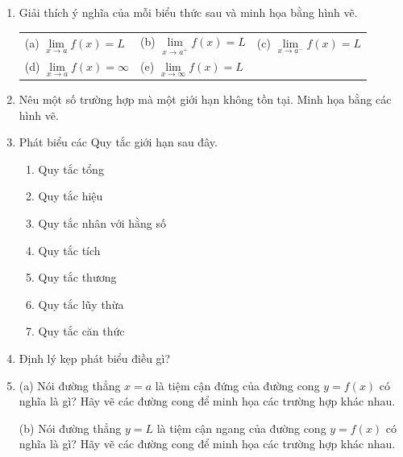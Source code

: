 \documentclass[10pt,letterpaper]{article}
\begin{document}
\begin{minipage}[t]{0.485\textwidth}
\begin{enumerate}[label=\textbf{\arabic*.}, leftmargin=1.5em, start=1, itemsep=6pt, topsep=0pt]
    \item Giải thích ý nghĩa của mỗi biểu thức sau và minh họa bằng hình vẽ.
    \par\vspace{2pt}
    \begingroup
    \setlength{\tabcolsep}{1.5pt}
    \begin{tabular}{@{}lll@{}}
        (a) $\lim\limits_{x\to a} f(x) = L$ & (b) $\lim\limits_{x\to a^+} f(x) = L$ & (c) $\lim\limits_{x\to a^-} f(x) = L$ \\[5pt]
        (d) $\lim\limits_{x\to a} f(x) = \infty$ & (e) $\lim\limits_{x\to \infty} f(x) = L$ &
    \end{tabular}
    \endgroup

    \item Nêu một số trường hợp mà một giới hạn không tồn tại. Minh họa bằng các hình vẽ.

    \item Phát biểu các Quy tắc giới hạn sau đây.
    \begin{enumerate}[label=(\alph*), leftmargin=1.6em, itemsep=1.5pt, topsep=2pt]
        \item Quy tắc tổng
        \item Quy tắc hiệu
        \item Quy tắc nhân với hằng số
        \item Quy tắc tích
        \item Quy tắc thương
        \item Quy tắc lũy thừa
        \item Quy tắc căn thức
    \end{enumerate}

    \item Định lý kẹp phát biểu điều gì?

    \item (a) Nói đường thẳng $x = a$ là tiệm cận đứng của đường cong $y = f(x)$ có nghĩa là gì? Hãy vẽ các đường cong để minh họa các trường hợp khác nhau.
    \par\vspace{2pt}
    (b) Nói đường thẳng $y = L$ là tiệm cận ngang của đường cong $y = f(x)$ có nghĩa là gì? Hãy vẽ các đường cong để minh họa các trường hợp khác nhau.
\end{enumerate}
\end{minipage}%
\hfill
\end{document}
